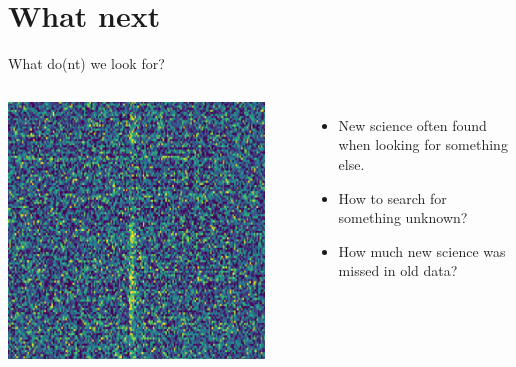 \documentclass[aspectratio=169]{beamer}
\begin{document}
\section{What next}

\begin{frame}{What do(nt) we look for?}
  \begin{columns}
      \centering
      \includegraphics[width=0.9\textwidth]{images/frb.png}
      \begin{itemize}
        \item New science often found when looking for something else.
        \item How to search for something unknown?
        \item How much new science was missed in old data?
      \end{itemize}
  \end{columns}
\end{frame}
\end{document}
